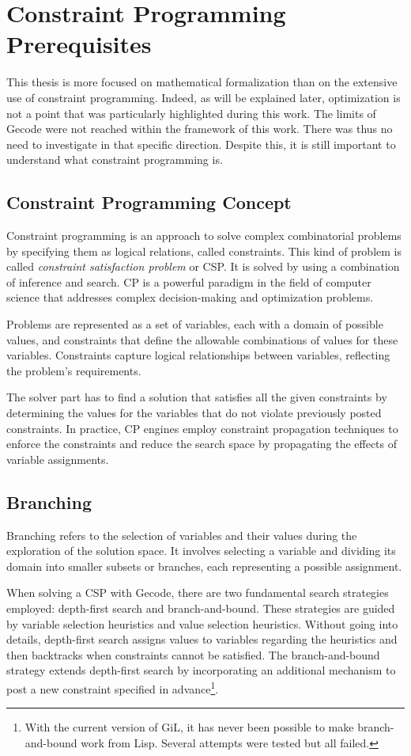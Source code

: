 \section{Constraint Programming Prerequisites}
This thesis is more focused on mathematical formalization than on the extensive use of constraint programming. Indeed, as will be explained later, optimization is not a point that was particularly highlighted during this work. The limits of Gecode were not reached within the framework of this work. There was thus no need to investigate in that specific direction. Despite this, it is still important to understand what constraint programming is. 

\subsection{Constraint Programming Concept}
Constraint programming is an approach to solve complex combinatorial problems by specifying them as logical relations, called constraints\parencite{CPbook}. This kind of problem is called \textit{constraint satisfaction problem} or CSP. It is solved by using a combination of inference and search. CP is a powerful paradigm in the field of computer science that addresses complex decision-making and optimization problems.

Problems are represented as a set of variables, each with a domain of possible values, and constraints that define the allowable combinations of values for these variables. Constraints capture logical relationships between variables, reflecting the problem's requirements.

The solver part has to find a solution that satisfies all the given constraints by determining the values for the variables that do not violate previously posted constraints. In practice, CP engines employ constraint propagation techniques to enforce the constraints and reduce the search space by propagating the effects of variable assignments.

\subsection{Branching}
Branching refers to the selection of variables and their values during the exploration of the solution space. It involves selecting a variable and dividing its domain into smaller subsets or branches, each representing a possible assignment.

When solving a CSP with Gecode, there are two fundamental search strategies employed: depth-first search and branch-and-bound. These strategies are guided by variable selection heuristics and value selection heuristics. Without going into details, depth-first search assigns values to variables regarding the heuristics and then backtracks when constraints cannot be satisfied. The branch-and-bound strategy extends depth-first search by incorporating an additional mechanism to post a new constraint specified in advance\footnote{With the current version of GiL, it has never been possible to make branch-and-bound work from Lisp. Several attempts were tested but all failed.}.

